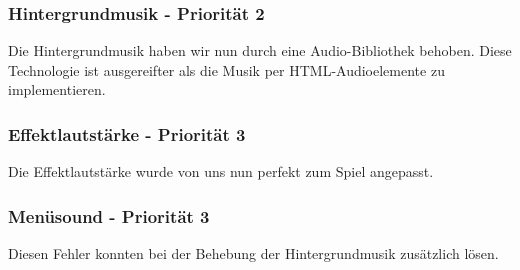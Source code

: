 \subsubsection{Hintergrundmusik - Priorität 2}
Die Hintergrundmusik haben wir nun durch eine Audio-Bibliothek behoben. Diese Technologie ist ausgereifter als die Musik per HTML-Audioelemente zu implementieren.
\subsubsection{Effektlautstärke - Priorität 3}
Die Effektlautstärke wurde von uns nun perfekt zum Spiel angepasst.
\subsubsection{Menüsound - Priorität 3}
Diesen Fehler konnten bei der Behebung der Hintergrundmusik zusätzlich lösen.